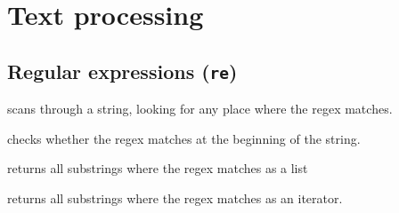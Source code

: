 \section{Text processing}
\subsection{Regular expressions (\texttt{re})}
 scans through a string, looking for any
place where the regex matches.

 checks whether the regex matches at the
beginning of the string.

 returns all substrings where the regex
matches as a list

 returns all substrings where the regex
matches as an iterator.
